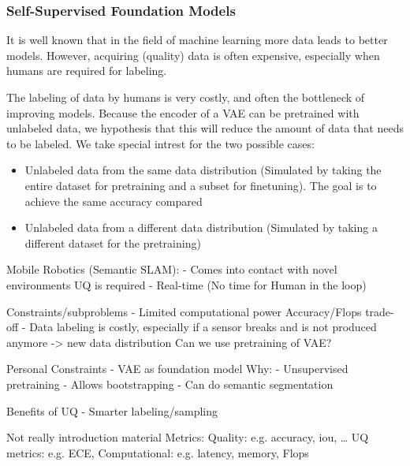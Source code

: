 \subsubsection{Self-Supervised Foundation Models}
It is well known that in the field of machine learning more data leads to better models. However, acquiring (quality) data is often expensive, especially when humans are required for labeling.

The labeling of data by humans is very costly, and often the bottleneck of improving models. Because the encoder of a VAE can be pretrained with unlabeled data, we hypothesis that this will reduce the amount of data that needs to be labeled. We take special intrest for the two possible cases:
\begin{itemize}
    \item Unlabeled data from the same data distribution (Simulated by taking the entire dataset for pretraining and a subset for finetuning). The goal is to achieve the same accuracy compared
    \item Unlabeled data from a different data distribution (Simulated by taking a different dataset for the pretraining)
\end{itemize}


Mobile Robotics (Semantic SLAM):
- Comes into contact with novel environments
UQ is required
- Real-time (No time for Human in the loop)


Constraints/subproblems
- Limited computational power
Accuracy/Flops trade-off
- Data labeling is costly, especially if a sensor breaks and is not produced anymore -> new data distribution
Can we use pretraining of VAE?

Personal Constraints
- VAE as foundation model
Why:
- Unsupervised pretraining
- Allows bootstrapping
- Can do semantic segmentation

Benefits of UQ
- Smarter labeling/sampling

Not really introduction material
Metrics:
Quality: e.g. accuracy, iou, \dots
UQ metrics: e.g. ECE,
Computational: e.g. latency, memory, Flops
